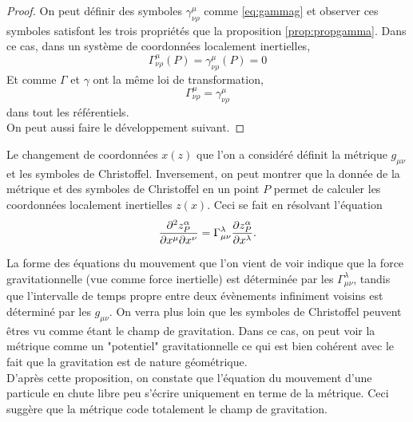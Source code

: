 \documentclass[a4paper,11pt]{report}
\begin{document}
            \begin{proof}
                On peut définir des symboles $\gamma^\mu_{\nu\rho}$ comme \ref{eq:gammag} et observer ces symboles satisfont les trois propriétés que la proposition \ref{prop:propgamma}. Dans ce cas, dans un système de coordonnées localement inertielles,
                \begin{equation}
                    \Gamma^\mu_{\nu\rho}(P) = \gamma^\mu_{\nu\rho}(P) = 0
                \end{equation}
                Et comme $\Gamma$ et $\gamma$ ont la même loi de transformation, 
                \begin{equation}
                    \Gamma^\mu_{\nu\rho} = \gamma^\mu_{\nu\rho}
                \end{equation}
                dans tout les référentiels.\\
                
                On peut aussi faire le développement suivant. 
                \comp
            \end{proof}
            
            Le changement de coordonnées $x(z)$ que l'on a considéré définit la métrique $g_{\mu\nu}$ et les symboles de Christoffel. Inversement, on peut montrer que la donnée de la métrique et des symboles de Christoffel en un point $P$ permet de calculer les coordonnées localement inertielles $z(x)$. Ceci se fait en résolvant l'équation
            \begin{equation}
                \pdv{z^\alpha_P}{x^\mu}{x^\nu} = \Gamma^\lambda_{\mu\nu}\pdv{z^\alpha_P}{x^\lambda}.
            \end{equation}
            
            La forme des équations du mouvement que l'on vient de voir indique que la force gravitationnelle (vue comme force inertielle) est déterminée par les $\Gamma^\lambda_{\mu\nu}$, tandis que l'intervalle de temps propre entre deux évènements infiniment voisins est déterminé par les $g_{\mu\nu}$. On verra plus loin que les symboles de Christoffel peuvent êtres vu comme étant le champ de gravitation. Dans ce cas, on peut voir la métrique comme un "potentiel" gravitationnelle ce qui est bien cohérent avec le fait que la gravitation est de nature géométrique.\\
            
            D'après cette proposition, on constate que l'équation du mouvement d'une particule en chute libre peu s'écrire uniquement en terme de la métrique. Ceci suggère que la métrique code totalement le champ de gravitation.
            
\end{document}
